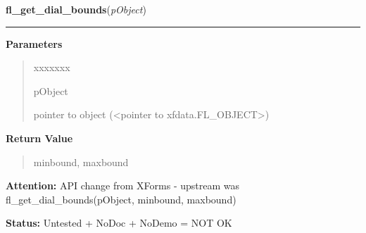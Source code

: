 \hspace{.8\funcindent}\begin{boxedminipage}{\funcwidth}

    \raggedright \textbf{fl\_get\_dial\_bounds}(\textit{pObject})

    \vspace{-1.5ex}

    \rule{\textwidth}{0.5\fboxrule}
\setlength{\parskip}{2ex}
\setlength{\parskip}{1ex}
      \textbf{Parameters}
      \vspace{-1ex}

      \begin{quote}
        \begin{Ventry}{xxxxxxx}

          \item[pObject]

          pointer to object ({\textless}pointer to 
          xfdata.FL\_OBJECT{\textgreater})

        \end{Ventry}

      \end{quote}

      \textbf{Return Value}
    \vspace{-1ex}

      \begin{quote}
      minbound, maxbound

      \end{quote}

\textbf{Attention:} API change from XForms - upstream was fl\_get\_dial\_bounds(pObject, 
minbound, maxbound)



\textbf{Status:} Untested + NoDoc + NoDemo = NOT OK



    \end{boxedminipage}

    \label{xformslib:library:fl_set_dial_step}

    \vspace{0.5ex}

